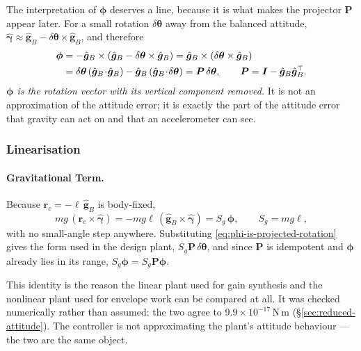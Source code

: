The interpretation of $\bm{\phi}$ deserves a line, because it is what makes
the projector $\bm{P}$ appear later. For a small rotation $\delta\bm{\theta}$
away from the balanced attitude,
$\hat{\bm{\gamma}} \approx \hat{\bm{g}}_B - \delta\bm{\theta}\times
\hat{\bm{g}}_B$, and therefore
%
\begin{align}
  \bm{\phi}
   &= -\hat{\bm{g}}_B\times
      \left(\hat{\bm{g}}_B - \delta\bm{\theta}\times\hat{\bm{g}}_B\right)
    = \hat{\bm{g}}_B\times(\delta\bm{\theta}\times\hat{\bm{g}}_B)
    \notag\\
   &= \delta\bm{\theta}\,(\hat{\bm{g}}_B\!\cdot\!\hat{\bm{g}}_B)
      - \hat{\bm{g}}_B\,(\hat{\bm{g}}_B\!\cdot\!\delta\bm{\theta})
    = \bm{P}\,\delta\bm{\theta},
  \qquad
  \bm{P} = \bm{I} - \hat{\bm{g}}_B\hat{\bm{g}}_B^{\top}.
  \label{eq:phi-is-projected-rotation}
\end{align}
%
\emph{$\bm{\phi}$ is the rotation vector with its vertical component removed.}
It is not an approximation of the attitude error; it is exactly the part of
the attitude error that gravity can act on and that an accelerometer can see.

\subsubsection{Linearisation}
\label{sec:linearisation}

\paragraph{Gravitational Term.} Because
$\bm{r}_c = -\ell\,\hat{\bm{g}}_B$ is body-fixed,
%
\begin{equation}
  m g\,(\bm{r}_c\times\hat{\bm{\gamma}})
  = -m g \ell\,(\hat{\bm{g}}_B\times\hat{\bm{\gamma}})
  = S_g\,\bm{\phi},
  \qquad S_g = m g \ell,
  \label{eq:grav-exact}
\end{equation}
%
with no small-angle step anywhere. Substituting
\eqref{eq:phi-is-projected-rotation} gives the form used in the design plant,
$S_g\bm{P}\,\delta\bm{\theta}$, and since $\bm{P}$ is idempotent and
$\bm{\phi}$ already lies in its range, $S_g\bm{\phi} = S_g\bm{P}\bm{\phi}$.

This identity is the reason the linear plant used for gain synthesis and the
nonlinear plant used for envelope work can be compared at all. It was checked
numerically rather than assumed: the two agree to
$9.9\times10^{-17}$\,N\,m (\S\ref{sec:reduced-attitude}). The controller is
not approximating the plant's attitude behaviour --- the two are the same
object.

